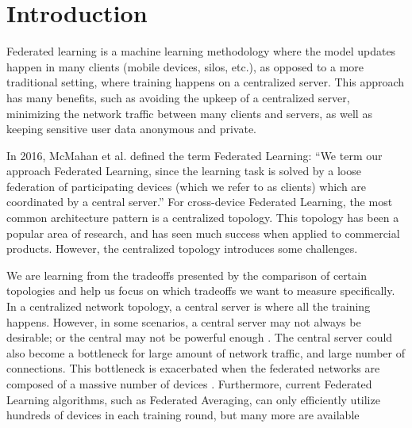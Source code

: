 \documentclass[10pt,twocolumn,letterpaper]{article}
\theoremstyle{definition}
\begin{document}
\section{Introduction}



Federated learning is a machine learning methodology where the model updates happen in many clients (mobile devices, silos, etc.), as opposed to a more traditional setting, where training happens on a centralized server. This approach has many benefits, such as avoiding the upkeep of a centralized server, minimizing the network traffic between many clients and servers, as well as keeping sensitive user data anonymous and private. 

In 2016, McMahan et al.\cite{2016arXiv160205629B} defined the term Federated Learning: “We term our approach Federated Learning, since the learning task is solved by a loose federation of participating devices (which we refer to as clients) which are coordinated by a central server.” For cross-device Federated Learning, the most common architecture pattern is a centralized topology. This topology has been a popular area of research, and has seen much success when applied to commercial products. However, the centralized topology introduces some challenges. 

We are learning from the tradeoffs presented by the comparison of certain topologies and help us focus on which tradeoffs we want to measure specifically.
In a centralized network topology, a central server is where all the training happens. However, in some scenarios, a central server may not always be desirable; or the central may not be powerful enough \cite{2016arXiv161005202V}. The central server could also become a bottleneck for large amount of network traffic, and large number of connections. This bottleneck is exacerbated when the federated networks are composed of a massive number of devices \cite{2017arXiv170509056L}. Furthermore, current Federated Learning algorithms, such as Federated Averaging, can only efficiently utilize hundreds of devices in each training round, but many more are available \cite{2019arXiv190201046B}
\end{document}
